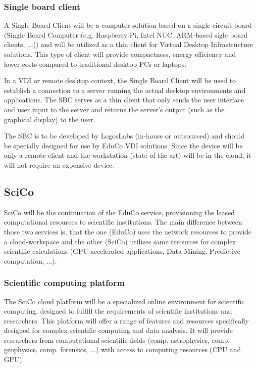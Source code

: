 \documentclass[]{article}
\begin{document}
\subsubsection{Single board client}
A Single Board Client will be a computer solution based on a single circuit board (Single Board Computer (e.g. Raspberry Pi, Intel NUC, ARM-based sigle board clients, ...)) and will be utilized as a thin client for Virtual Desktop Infrastructure solutions.
This type of client will provide compactness, energy efficiency and lower costs compared to traditional desktop PCs or laptops.

In a VDI or remote desktop context, the Single Board Client will be used to establish a connection to a server running the actual desktop environments and applications. 
The SBC serves as a thin client that only sends the user interface and user input to the server and returns the server's output (such as the graphical display) to the user.

The SBC is to be developed by LogosLabs (in-house or outsourced) and should be specially designed for use by EduCo VDI solutions. 
Since the device will be only a remote client and the workstation (state of the art) will be in the cloud, it will not require an expensive device.

\subsection{SciCo}
SciCo will be the continuation of the EduCo service, provisioning the leased computational resources to scientific institutions. 
The main difference between those two services is, that the one (EduCo) uses the network resources to provide a cloud-workspace and the other (SciCo) utilizes same resources for complex scientific calculations (GPU-accelerated applications, Data Mining, Predictive computation, ...). 

\subsubsection{Scientific computing platform}
The SciCo cloud platform will be a specialized online environment for scientific computing, designed to fulfill the requirements of scientific institutions and researchers. 
This platform will offer a range of features and resources specifically designed for complex scientific computing and data analysis.
It will provide researchers from computational scientific fields (comp. astrophysics, comp. geophysics, comp. forensics, ...) with access to computing resources (CPU and GPU).
\end{document}

